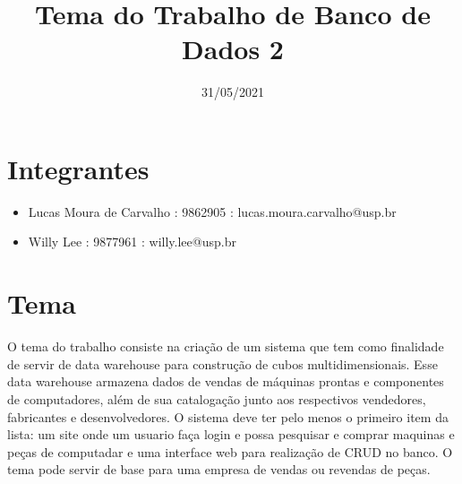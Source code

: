 \documentclass[9pt, a4paper]{article}
\title{Tema do Trabalho de Banco de Dados 2}
\date{31/05/2021}
\begin{document}
\maketitle

\newpage

\section*{Integrantes}

\begin{itemize}
	\item Lucas Moura de Carvalho : 9862905 : lucas.moura.carvalho@usp.br
	\item Willy Lee : 9877961 : willy.lee@usp.br
\end{itemize}

\section*{Tema}
	
	O tema do trabalho consiste na criação de um sistema que tem como finalidade de servir de data warehouse para construção de cubos multidimensionais.  Esse data warehouse armazena dados de vendas de máquinas prontas e componentes de computadores, além de sua catalogação junto aos respectivos vendedores, fabricantes e desenvolvedores. O sistema deve ter pelo menos o primeiro item da lista: um site onde um usuario faça login e possa pesquisar e comprar maquinas e peças de computadar e uma interface web para realização de CRUD no banco. O tema pode servir de base para uma empresa de vendas ou revendas de peças. 
\end{document}
